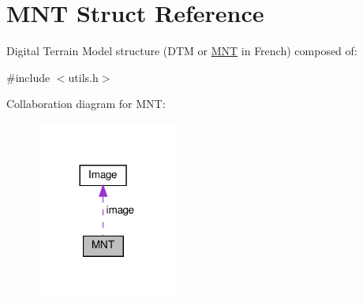 \hypertarget{structMNT}{}\section{M\+NT Struct Reference}
\label{structMNT}


Digital Terrain Model structure (D\+TM or \hyperlink{structMNT}{M\+NT} in French) composed of\+:  




{\ttfamily \#include $<$utils.\+h$>$}



Collaboration diagram for M\+NT\+:\nopagebreak
\begin{figure}[H]
\begin{center}
\leavevmode
\includegraphics[width=132pt]{structMNT__coll__graph}
\end{center}
\end{figure}
